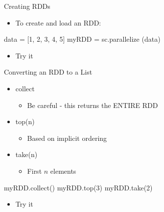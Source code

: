 \documentclass[aspectratio=169]{beamer}
\begin{document}

\begin{frame}[fragile]{Creating RDDs}

\begin{itemize}
\item To create and load an RDD:
\end{itemize}

\begin{SQL}
data = [1, 2, 3, 4, 5]
myRDD = sc.parallelize (data) 
\end{SQL}

\begin{itemize}
\item Try it
\end{itemize}

\end{frame}


\begin{frame}[fragile]{Converting an RDD to a List}

\begin{itemize}
\item collect
\begin{itemize}
\item Be careful - this returns the ENTIRE RDD
\end{itemize}
\item top(n) 
\begin{itemize}
\item Based on implicit ordering
\end{itemize}
\item take(n) 
\begin{itemize}
\item First $n$ elements
\end{itemize}
\end{itemize}

\begin{SQL}
myRDD.collect()
myRDD.top(3)
myRDD.take(2)
\end{SQL}

\begin{itemize}
\item Try it
\end{itemize}

\end{frame}

\end{document}
